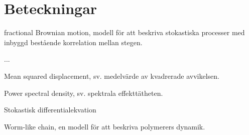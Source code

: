 
\chapter{Beteckningar}
\begin{description}[align=left]

\item[fBm] fractional Brownian motion, modell för att beskriva stokastiska processer med inbyggd bestående korrelation mellan stegen.
\item[filament] ...
\item[MSD] Mean squared displacement, sv. medelvärde av kvadrerade avvikelsen.
\item[PSD] Power spectral density, sv. spektrala effekttätheten.
\item[SDE] Stokastisk differentialekvation
\item[WLC] Worm-like chain, en modell för att beskriva polymerers dynamik.

\end{description}




